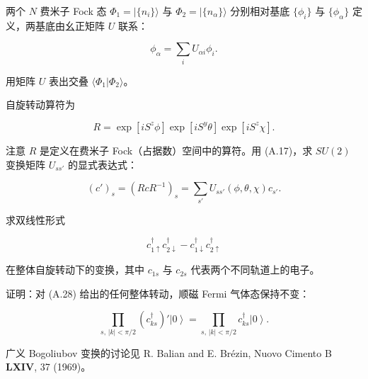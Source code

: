 \begin{exercises}

\item 两个 $N$ 费米子 Fock 态 $\Phi_1 = |\{n_i\} \rangle$ 与 $\Phi_2 = |\{n_\alpha\} \rangle$ 分别相对基底 $\{\phi_i\}$ 与 $\{\phi_\alpha\}$ 定义，两基底由幺正矩阵 $U$ 联系：

\begin{equation*}
\phi_ {\alpha} = \sum_ {i} U _ {\alpha i} \phi _ {i}.
\tag{A.26}
\end{equation*}

用矩阵 $U$ 表出交叠 $\langle\Phi_{1}|\Phi_{2}\rangle$。

\item 自旋转动算符为

\begin{equation*}
R = \exp \left[ iS ^ {z} \phi \right] \exp \left[ iS ^ {y} \theta \right] \exp \left[ iS ^ {z} \chi \right].
\tag{A.27}
\end{equation*}

注意 $R$ 是定义在费米子 Fock（占据数）空间中的算符。用 (A.17)，求 $SU(2)$ 变换矩阵 $U_{ss'}$ 的显式表达式：

\begin{equation*}
\left( c ' \right)_{s} = \left( R c R ^ {- 1} \right)_{s} = \sum_ {s '} U _ {ss'} \left( \phi, \theta, \chi \right) c _ {s '}.
\tag{A.28}
\end{equation*}

\item 求双线性形式

\begin{equation*}
c _ {1 \uparrow} ^ {\dagger} c _ {2 \downarrow} ^ {\dagger} - c _ {1 \downarrow} ^ {\dagger} c _ {2 \uparrow} ^ {\dagger}
\tag{A.29}
\end{equation*}

在整体自旋转动下的变换，其中 $c_{1s}$ 与 $c_{2s}$ 代表两个不同轨道上的电子。

\item 证明：对 (A.28) 给出的任何整体转动，顺磁 Fermi 气体态保持不变：

\begin{equation*}
\prod_{s, \, | k | < \pi / 2} \left( c _ {ks} ^ {\dagger} \right) ' \left| 0 \right\rangle = \prod_{s, \, | k | < \pi / 2} c _ {ks} ^ {\dagger} \left| 0 \right\rangle .
\tag{A.30}
\end{equation*}

\end{exercises}

\begin{chapbib}
\item 广义 Bogoliubov 变换的讨论见
  R. Balian and E. Brézin, Nuovo Cimento B \textbf{LXIV}, 37 (1969)。
\end{chapbib}
